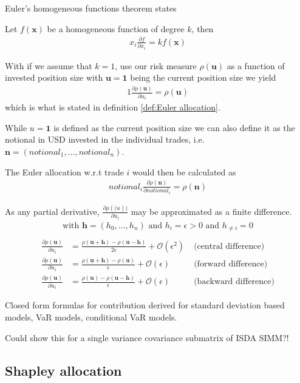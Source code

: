 \documentclass[../Thesis_AHoecherl.tex]{subfiles}
\begin{document}
Euler's homogeneous functions theorem states
\begin{theorem}
    Let $f\left(\mathbf{x}\right)$ be a homogeneous function of degree $k$, then
    \begin{align}
        x_i \frac{\partial f}{\partial x_i} = k f(\mathbf{x})
    \end{align}
\end{theorem}

With if we assume that $k=1$, use our risk measure $\rho(\mathbf{u})$ as a function of invested position size with $\mathbf{u} = \mathbf{1}$ being the current position size we yield
\begin{align}
    1\frac{\partial \rho(\mathbf{u})}{\partial u_i} = \rho(\mathbf{u})
    \label{eq:relative bump euler allocation}
\end{align}
which is what is stated in definition \ref{def:Euler allocation}.

While $u = \mathbf{1}$ is defined as the current position size we can also define it as the notional in USD invested in the individual trades, i.e. $\mathbf{n} = (notional_1, \dots, notional_n)$.

The Euler allocation w.r.t trade $i$ would then be calculated as
\begin{align}
    notional_i\frac{\partial \rho(\mathbf{n})}{\partial notional_i} = \rho(\mathbf{n})
    \label{eq:notional based euler allocation}
\end{align}


As any partial derivative, $\frac{\partial \rho(\mathbf(u))}{\partial u_i}$ may be approximated as a finite difference.
\begin{gather*}
    \text{with }\mathbf{h}=(h_0,\dots,h_n) \text{ and } h_i = \epsilon > 0 \text{ and } h_{\neq i}=0 \\ 
\end{gather*}
\begin{align}
    \label{eq:central difference}
    \frac{\partial \rho(\mathbf{u})}{\partial u_i} &= \frac{\rho(\mathbf{u}+\mathbf{h})-\rho(\mathbf{u}-\mathbf{h})}{2\epsilon} + \mathcal{O}(\epsilon^2) \; &\text{(central difference)} \\
    \label{eq:forward difference}
    \frac{\partial \rho(\mathbf{u})}{\partial u_i} &= \frac{\rho(\mathbf{u}+\mathbf{h})-\rho(\mathbf{u})}{\epsilon} + \mathcal{O}(\epsilon) &\text{(forward difference)}\\ 
    \label{eq:backward difference}
    \frac{\partial \rho(\mathbf{u})}{\partial u_i} &= \frac{\rho(\mathbf{u})-\rho(\mathbf{u}-\mathbf{h})}{\epsilon} + \mathcal{O}(\epsilon) &\text{(backward difference)}
\end{align}


Closed form formulas for contribution derived for standard deviation based models, VaR models, conditional VaR models.

Could show this for a single variance covariance submatrix of ISDA SIMM?!

\subsection{Shapley allocation}

\end{document}
